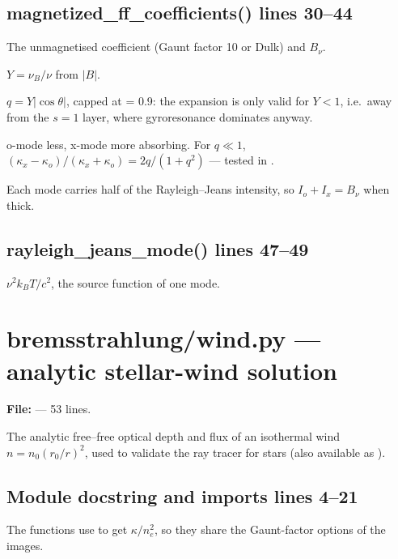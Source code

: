 \section*{\normalsize magnetized\_ff\_coefficients() \hfill{\small\mdseries\color{gray}lines 30--44}}

\begin{lines}
\item[L.38] The unmagnetised coefficient (Gaunt factor 10 or Dulk) and $B_\nu$.
\item[L.39] $Y=\nu_B/\nu$ from $|B|$.
\item[L.40] $q=Y|\cos\theta|$, capped at  = 0.9: the expansion is only valid for $Y<1$, i.e.\ away from the $s=1$ layer, where gyroresonance dominates anyway.
\item[L.41–42] o-mode less, x-mode more absorbing. For $q\ll1$, $(\kappa_x-\kappa_o)/(\kappa_x+\kappa_o)=2q/(1+q^2)$ --- tested in .
\item[L.43] Each mode carries half of the Rayleigh--Jeans intensity, so $I_o+I_x=B_\nu$ when thick.
\end{lines}
\section*{\normalsize rayleigh\_jeans\_mode() \hfill{\small\mdseries\color{gray}lines 47--49}}

$\nu^2k_BT/c^2$, the source function of one mode.


\chapter{bremsstrahlung/wind.py --- analytic stellar-wind solution}
\label{mod:bremsstrahlung:wind.py}
\textbf{File:}  --- 53 lines.

The analytic free--free optical depth and flux of an isothermal wind
$n=n_0(r_0/r)^2$, used to validate the ray tracer for stars (also available as
).

\section*{\normalsize Module docstring and imports \hfill{\small\mdseries\color{gray}lines 4--21}}

The functions use  to get $\kappa/n_e^2$, so they share the Gaunt-factor options of the images.

